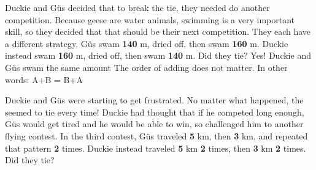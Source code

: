 \documentclass[a4paper,11pt ]{book}
\begin{document}
{Duckie and Güs decided that to break the tie, they needed do another competition. \linebreak Because geese are water animals, swimming is a very important skill, so they decided that that should be their next competition. They each have a different strategy. Güs swam \textbf{140} m, dried off, then swam \textbf{160} m. Duckie instead swam \textbf{160} m, dried off, then swam \textbf{140} m. Did they tie?}
{Yes! Duckie and Güs swam the same amount}
{The order of adding does not matter. In other words: A+B = B+A}
{}
{Duckie and Güs were starting to get frustrated. No matter what happened, the seemed to tie every time! Duckie had thought that if he competed long enough, Güs would get tired and he would be able to win, so challenged him to another flying contest. In the third contest, Güs traveled \textbf{5} km, then \textbf{3} km, and repeated that pattern \textbf{2} times. Duckie instead traveled \textbf{5} km \textbf{2} times, then \textbf{3} km \textbf{2} times. Did they tie?}
\end{document}
